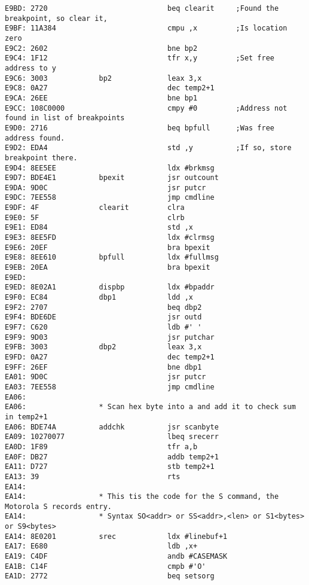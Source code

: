 {\begin{verbatim}
E9BD: 2720                            beq clearit     ;Found the breakpoint, so clear it,
E9BF: 11A384                          cmpu ,x         ;Is location zero
E9C2: 2602                            bne bp2
E9C4: 1F12                            tfr x,y         ;Set free address to y
E9C6: 3003            bp2             leax 3,x
E9C8: 0A27                            dec temp2+1
E9CA: 26EE                            bne bp1
E9CC: 108C0000                        cmpy #0         ;Address not found in list of breakpoints
E9D0: 2716                            beq bpfull      ;Was free address found.
E9D2: EDA4                            std ,y          ;If so, store breakpoint there.
E9D4: 8EE5EE                          ldx #brkmsg     
E9D7: BDE4E1          bpexit          jsr outcount
E9DA: 9D0C                            jsr putcr
E9DC: 7EE558                          jmp cmdline
E9DF: 4F              clearit         clra
E9E0: 5F                              clrb
E9E1: ED84                            std ,x
E9E3: 8EE5FD                          ldx #clrmsg
E9E6: 20EF                            bra bpexit
E9E8: 8EE610          bpfull          ldx #fullmsg
E9EB: 20EA                            bra bpexit              
E9ED:                 
E9ED: 8E02A1          dispbp          ldx #bpaddr
E9F0: EC84            dbp1            ldd ,x
E9F2: 2707                            beq dbp2
E9F4: BDE6DE                          jsr outd
E9F7: C620                            ldb #' '
E9F9: 9D03                            jsr putchar
E9FB: 3003            dbp2            leax 3,x
E9FD: 0A27                            dec temp2+1
E9FF: 26EF                            bne dbp1
EA01: 9D0C                            jsr putcr
EA03: 7EE558                          jmp cmdline
EA06:                 
EA06:                 * Scan hex byte into a and add it to check sum in temp2+1
EA06: BDE74A          addchk          jsr scanbyte
EA09: 10270077                        lbeq srecerr
EA0D: 1F89                            tfr a,b
EA0F: DB27                            addb temp2+1
EA11: D727                            stb temp2+1
EA13: 39                              rts
EA14:                 
EA14:                 * This tis the code for the S command, the Motorola S records entry.
EA14:                 * Syntax SO<addr> or SS<addr>,<len> or S1<bytes> or S9<bytes>
EA14: 8E0201          srec            ldx #linebuf+1
EA17: E680                            ldb ,x+
EA19: C4DF                            andb #CASEMASK
EA1B: C14F                            cmpb #'O'
EA1D: 2772                            beq setsorg

\end{verbatim}}
